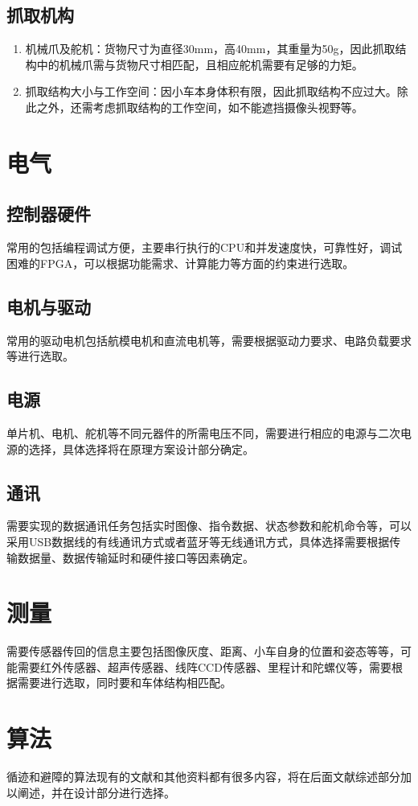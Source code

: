 \documentclass{report}
\begin{document}
\subsection{抓取机构}
\label{subsec:label}
\begin{enumerate}
\item 机械爪及舵机：货物尺寸为直径30mm，高40mm，其重量为50g，因此抓取结构中的机械爪需与货物尺寸相匹配，且相应舵机需要有足够的力矩。
  \item 抓取结构大小与工作空间：因小车本身体积有限，因此抓取结构不应过大。除此之外，还需考虑抓取结构的工作空间，如不能遮挡摄像头视野等。
\end{enumerate}
\section{电气}
\label{subsec:label}
\subsection{控制器硬件}
\label{subsec:label}
常用的包括编程调试方便，主要串行执行的CPU和并发速度快，可靠性好，调试困难的FPGA，可以根据功能需求、计算能力等方面的约束进行选取。
\subsection{电机与驱动}
\label{subsec:label}
常用的驱动电机包括航模电机和直流电机等，需要根据驱动力要求、电路负载要求等进行选取。
\subsection{电源}
\label{subsec:label}
单片机、电机、舵机等不同元器件的所需电压不同，需要进行相应的电源与二次电源的选择，具体选择将在原理方案设计部分确定。
\subsection{通讯}
\label{subsec:label}
需要实现的数据通讯任务包括实时图像、指令数据、状态参数和舵机命令等，可以采用USB数据线的有线通讯方式或者蓝牙等无线通讯方式，具体选择需要根据传输数据量、数据传输延时和硬件接口等因素确定。
\section{测量}
\label{sec:label}
需要传感器传回的信息主要包括图像灰度、距离、小车自身的位置和姿态等等，可能需要红外传感器、超声传感器、线阵CCD传感器、里程计和陀螺仪等，需要根据需要进行选取，同时要和车体结构相匹配。
\section{算法}
\label{sec:label}
循迹和避障的算法现有的文献和其他资料都有很多内容，将在后面文献综述部分加以阐述，并在设计部分进行选择。
\end{document}
